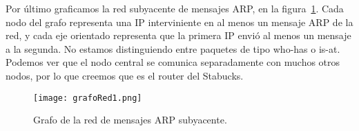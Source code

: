 Por último graficamos la red subyacente de mensajes ARP, en la figura~\ref{grafo1}. Cada nodo del grafo representa una IP interviniente en al menos un mensaje ARP de la red, y cada eje orientado representa que la primera IP envió al menos un mensaje a la segunda. No estamos distinguiendo entre paquetes de tipo who-has o is-at. Podemos ver que el nodo central se comunica separadamente con muchos otros nodos, por lo que creemos que es el router del Stabucks.

\begin{figure}[H]
\centering
\texttt{[image: grafoRed1.png]}
\caption{Grafo de la red de mensajes ARP subyacente.}
\label{grafo1}
\end{figure}

